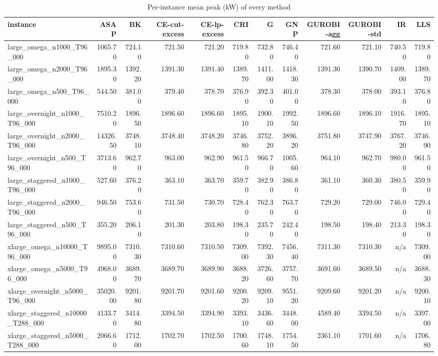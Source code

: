 \begin{table}[htbp]
\centering
\small
\caption{Per-instance mean peak (kW) of every method}
\label{tab:E6_scalability_b120_per_instance}
\begin{tabular}{lrrrrrrrrrrr}
\toprule
instance & ASAP & BK & CE-cut-excess & CE-lp-excess & CRI & G & GNP & GUROBI-agg & GUROBI-std & IR & LLS \\
\midrule
large\_omega\_n1000\_T96\_000 & 1065.70 & 724.10 & 721.50 & 721.20 & 719.80 & 732.80 & 746.40 & 721.60 & 721.10 & 740.50 & 719.80 \\
large\_omega\_n2000\_T96\_000 & 1895.30 & 1392.20 & 1391.30 & 1391.40 & 1389.70 & 1411.00 & 1418.30 & 1391.30 & 1390.70 & 1409.00 & 1389.70 \\
large\_omega\_n500\_T96\_000 & 544.50 & 381.00 & 379.40 & 378.70 & 376.90 & 392.30 & 401.00 & 378.30 & 378.00 & 393.10 & 376.80 \\
large\_overnight\_n1000\_T96\_000 & 7510.20 & 1896.50 & 1896.60 & 1896.60 & 1895.10 & 1900.10 & 1992.50 & 1896.60 & 1896.10 & 1916.70 & 1895.10 \\
large\_overnight\_n2000\_T96\_000 & 14326.50 & 3748.10 & 3748.40 & 3748.20 & 3746.80 & 3752.20 & 3896.20 & 3751.80 & 3747.90 & 3767.20 & 3746.90 \\
large\_overnight\_n500\_T96\_000 & 3713.60 & 962.70 & 963.00 & 962.90 & 961.50 & 966.70 & 1005.60 & 964.10 & 962.70 & 980.00 & 961.50 \\
large\_staggered\_n1000\_T96\_000 & 527.60 & 376.20 & 363.10 & 363.70 & 359.70 & 382.90 & 386.80 & 361.10 & 360.30 & 380.50 & 359.90 \\
large\_staggered\_n2000\_T96\_000 & 946.50 & 753.60 & 731.50 & 730.70 & 728.40 & 762.30 & 763.70 & 729.20 & 729.00 & 746.00 & 729.40 \\
large\_staggered\_n500\_T96\_000 & 355.20 & 206.10 & 201.30 & 203.80 & 198.30 & 235.70 & 242.40 & 198.50 & 198.40 & 213.30 & 198.30 \\
xlarge\_omega\_n10000\_T96\_000 & 9895.00 & 7310.30 & 7310.60 & 7310.50 & 7309.00 & 7392.30 & 7456.40 & 7311.30 & 7310.30 & n/a & 7309.00 \\
xlarge\_omega\_n5000\_T96\_000 & 4968.00 & 3689.70 & 3689.70 & 3689.90 & 3688.20 & 3726.60 & 3757.70 & 3691.60 & 3689.50 & n/a & 3688.30 \\
xlarge\_overnight\_n5000\_T96\_000 & 35020.00 & 9201.80 & 9201.70 & 9201.60 & 9200.20 & 9209.10 & 9551.20 & 9209.60 & 9201.20 & n/a & 9200.10 \\
xlarge\_staggered\_n10000\_T288\_000 & 4133.70 & 3414.80 & 3394.50 & 3394.90 & 3393.10 & 3436.60 & 3448.00 & 4589.40 & 3394.50 & n/a & 3397.00 \\
xlarge\_staggered\_n5000\_T288\_000 & 2066.60 & 1712.00 & 1702.70 & 1702.50 & 1700.60 & 1748.10 & 1754.50 & 2361.10 & 1701.60 & n/a & 1706.80 \\
\bottomrule
\end{tabular}
\end{table}
